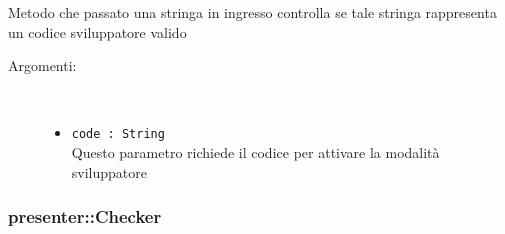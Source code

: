 \documentclass[../DefinizioneDiProdotto.tex]{subfiles}
\begin{document}
\begin{description}
\begin{itemize}
Metodo che passato una stringa in ingresso controlla se tale stringa rappresenta un codice sviluppatore valido
 \begin{description}
\item[Argomenti:] \
\begin{itemize}
\item \texttt{code : String}\\
Questo parametro richiede il codice per attivare la modalità sviluppatore\end{itemize}
\end{description}
\end{itemize}
\end{description}

\subsubsection{presenter::Checker}
\end{document}

